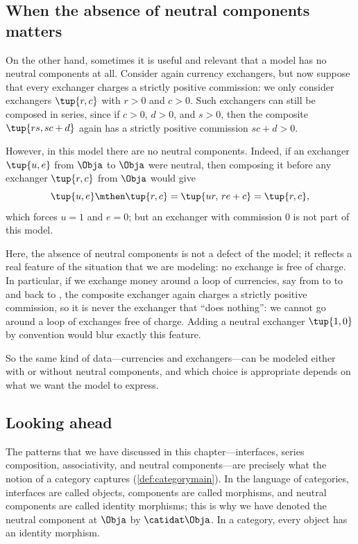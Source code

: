 \subsection{When the absence of neutral components matters}

On the other hand, sometimes it is useful and relevant that a model has no neutral components at all. Consider again currency exchangers, but now suppose that every exchanger charges a strictly positive commission: we only consider exchangers $\tup{r,c}$ with $r > 0$ and $c > 0$. Such exchangers can still be composed in series, since if $c > 0$, $d > 0$, and $s > 0$, then the composite $\tup{rs, sc+d}$ again has a strictly positive commission $sc + d > 0$.

However, in this model there are no neutral components. Indeed, if an exchanger $\tup{u,e}$ from $\Obja$ to $\Obja$ were neutral, then composing it before any exchanger $\tup{r,c}$ from $\Obja$ would give
\begin{equation}
    \tup{u,e} \mthen \tup{r,c} = \tup{ur, \, re + c} = \tup{r,c},
\end{equation}
which forces $u = 1$ and $e = 0$; but an exchanger with commission $0$ is not part of this model.

Here, the absence of neutral components is not a defect of the model; it reflects a real feature of the situation that we are modeling: no exchange is free of charge. In particular, if we exchange money around a loop of currencies, say from \CHF to \EUR to \USD and back to \CHF, the composite exchanger again charges a strictly positive commission, so it is never the exchanger that ``does nothing'': we cannot go around a loop of exchanges free of charge. Adding a neutral exchanger $\tup{1,0}$ by convention would blur exactly this feature.

So the same kind of data---currencies and exchangers---can be modeled either with or without neutral components, and which choice is appropriate depends on what we want the model to express.

\subsection{Looking ahead}

The patterns that we have discussed in this chapter---interfaces, series composition, associativity, and neutral components---are precisely what the notion of a category captures (\cref{def:categorymain}). In the language of categories, interfaces are called objects, components are called morphisms, and neutral components are called identity morphisms; this is why we have denoted the neutral component at $\Obja$ by $\catidat\Obja$. In a category, every object has an identity morphism.

